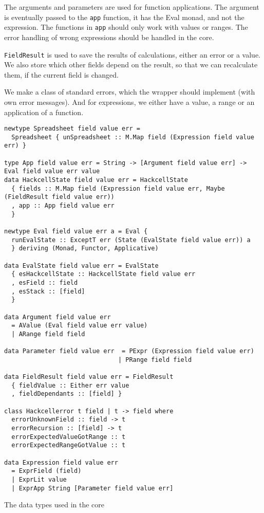 \documentclass{article}
\begin{document}
	The arguments and parameters are used for function applications. The argument is eventually passed to the \texttt{app} function, it has the Eval monad, and not the expression. The functions in \texttt{app} should only work with values or ranges. The error handling of wrong expressions should be handled in the core.
	
	\texttt{FieldResult} is used to save the results of calculations, either an error or a value. We also store which other fields depend on the result, so that we can recalculate them, if the current field is changed.
	
	We make a class of standard errors, which the wrapper should implement (with own error messages). And for expressions, we either have a value, a range or an application of a function.
	
	\begin{listing}
	\begin{verbatim}
newtype Spreadsheet field value err =
  Spreadsheet { unSpreadsheet :: M.Map field (Expression field value err) }
     
type App field value err = String -> [Argument field value err] -> Eval field value err value
data HackcellState field value err = HackcellState
  { fields :: M.Map field (Expression field value err, Maybe (FieldResult field value err))
  , app :: App field value err
  }

newtype Eval field value err a = Eval {
  runEvalState :: ExceptT err (State (EvalState field value err)) a
  } deriving (Monad, Functor, Applicative)

data EvalState field value err = EvalState
  { esHackcellState :: HackcellState field value err
  , esField :: field
  , esStack :: [field]
  }

data Argument field value err
  = AValue (Eval field value err value)
  | ARange field field

data Parameter field value err  = PExpr (Expression field value err)
                               | PRange field field
                               
data FieldResult field value err = FieldResult
  { fieldValue :: Either err value
  , fieldDependants :: [field] }

class Hackcellerror t field | t -> field where
  errorUnknownField :: field -> t
  errorRecursion :: [field] -> t
  errorExpectedValueGotRange :: t
  errorExpectedRangeGotValue :: t

data Expression field value err
  = ExprField (field)
  | ExprLit value
  | ExprApp String [Parameter field value err]
	\end{verbatim}
	\caption{The data types used in the core}
	\label{listing:datatypes}
	\end{listing}
\end{document}
